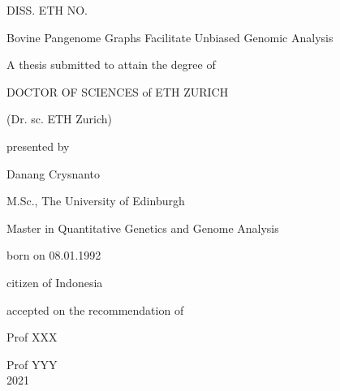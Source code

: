 \documentclass[../main.tex]{subfiles}
\begin{document}
\setlength{\parskip}{0pt}
\begin{center}
    \thispagestyle{empty}

    DISS. ETH NO.     

    \vspace{2cm}

    {\large Bovine Pangenome Graphs Facilitate Unbiased Genomic Analysis}

    \vspace{2cm}
    
    \doublespacing
    A thesis submitted to attain the degree of

    DOCTOR OF SCIENCES of ETH ZURICH

    (Dr. sc. ETH Zurich)
    \vspace{1cm}

    presented by

    \vspace{1cm}
    Danang Crysnanto  

    \vspace{1cm}

    M.Sc., The University of Edinburgh
    
    Master in Quantitative Genetics and Genome Analysis

    \vspace{1cm}

    born on 08.01.1992

    citizen of Indonesia

    \vspace{2cm}

    accepted on the recommendation of     

    Prof XXX 

    Prof YYY \\
    \vspace{2cm}
    2021
\end{center}
\end{document}
